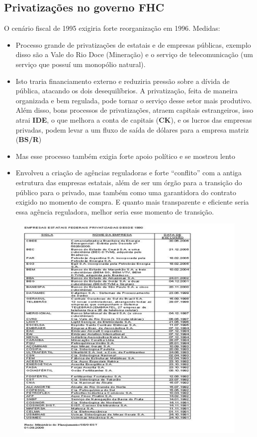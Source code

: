 \documentclass[a4paper,12pt]{article}[abntex2]
\begin{document}
\subsection{\textbf{Privatizações no governo FHC}}
O cenário fiscal de 1995 exigiria forte reorganização em 1996. Medidas:\begin{itemize}
    \item Processo grande de privatizações de estatais e de empresas públicas, exemplo disso são a Vale do Rio Doce (Mineração) e o serviço de telecomunicação (um serviço que possuí um monopólio natural).
    \item Isto traria financiamento externo e reduziria pressão sobre a dívida de pública, atacando os dois desequilíbrios. A privatização, feita de maneira organizada e  bem regulada, pode tornar o serviço desse setor mais produtivo. Além disso, bons processos de privatizações, atraem capitais estrangeiros, isso atrai \textbf{IDE}, o que melhora a conta de capitais (\textbf{CK}), e os lucros das empresas privadas, podem levar a um fluxo de saída de dólares para a empresa matriz (\textbf{BS/R})  
    \item Mas esse processo também exigia forte apoio político e se mostrou lento
    \item Envolveu a criação de agências reguladoras e forte “conflito” com a antiga estrutura das empresas estatais, além de ser um órgão para a transição do público para o privado, mas também como uma garantidora do contrato exigido no momento de compra. E quanto mais transparente e eficiente seria essa agência reguladora, melhor seria esse momento de transição.
\end{itemize}

\begin{figure}[H]
    \centering
    \includegraphics[width=0.7\linewidth]{Imagens/a14i10.png}
\end{figure}
\end{document}
